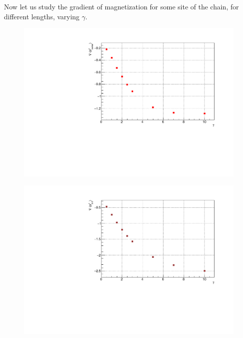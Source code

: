 Now let us study the gradient of magnetization for some site of the chain, for different lengths, varying $\gamma$.

\begin{figure}[H]
    \centering
    \includegraphics[scale=0.7]{Figures/8sites_comparison/8sites_gradLM_centerChainVSgamma.pdf}
    \caption{}
    \label{fig:my_label}
\end{figure}

\begin{figure}[H]
    \centering
    \includegraphics[scale=0.7]{Figures/8sites_comparison/8sites_gradLM_2and3VSgamma.pdf}
    \caption{}
    \label{fig:my_label}
\end{figure}

